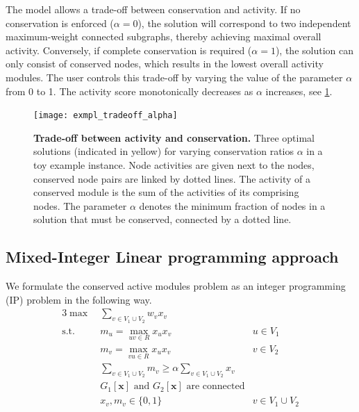 		The model allows a trade-off between conservation and activity.
		If no conservation is enforced ($\alpha = 0$), the solution will correspond to two independent maximum-weight connected subgraphs, thereby achieving maximal overall activity.
		Conversely, if complete conservation is required ($\alpha = 1$), the solution can only consist of conserved nodes, which results in the lowest overall activity modules.
		The user controls this trade-off by varying the value of the parameter $\alpha$ from 0 to 1.
		The activity score monotonically decreases as $\alpha$ increases, see \cref{fig:exmpl_tradeoff_alpha}.

		\begin{figure}[t]
			\centering
			\texttt{[image: exmpl\_tradeoff\_alpha]}
			\caption[Trade-off between activity and conservation]{\textbf{Trade-off between activity and conservation.}
				Three optimal solutions (indicated in yellow) for varying conservation ratios $\alpha$ in a toy example instance.
				Node activities are given next to the nodes, conserved node pairs are linked by dotted lines.
				The activity of a conserved module is the sum of the activities of its comprising nodes.
				The parameter $\alpha$ denotes the minimum fraction of nodes in a solution that must be conserved, \ie{} connected by a dotted line.
			}
			\label{fig:exmpl_tradeoff_alpha}
		\end{figure}

	\subsection{Mixed-Integer Linear programming approach}

		We formulate the conserved active modules problem as an integer programming (IP) problem in the following way.
		\allowdisplaybreaks
		\begin{alignat}{3}
		\label{eq:obj}           \max\: & \sum_{v \in V_1 \cup V_2} w_v x_v \\
		\label{eq:m_u}  \text{s.t.}\:\: & m_u = \max_{uv \in R}{x_u x_v} & u \in V_1\\
		\label{eq:m_v}                  & m_v = \max_{vu \in R}{x_u x_v} & v \in V_2\\
		\label{eq:b}                    & \sum_{v \in V_1 \cup V_2} m_v \geq \alpha \sum_{v \in V_1 \cup V_2} x_v &\\
		\label{eq:con}                  & \text{$G_1[\mathbf{x}]$ and $G_2[\mathbf{x}]$ are connected}&\\
		\label{eq:vars}                 & x_v, m_v \in \{0, 1\} & v \in V_1 \cup V_2
		\end{alignat}


